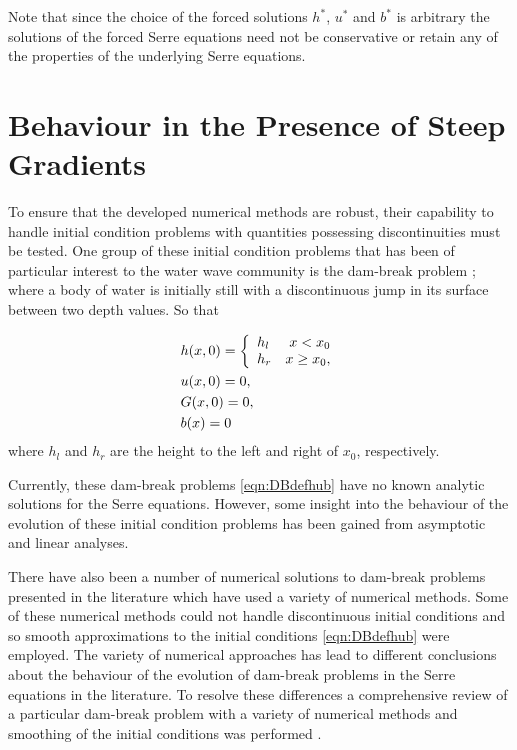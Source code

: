 Note that since the choice of the forced solutions $h^*$, $u^*$ and $b^*$ is arbitrary the solutions of the forced Serre equations need not be conservative or retain any of the properties of the underlying Serre equations. 


\section{Behaviour in the Presence of Steep Gradients}
To ensure that the developed numerical methods are robust, their capability to handle initial condition problems with quantities possessing discontinuities must be tested. One group of these initial condition problems that has been of particular interest to the water wave community is the dam-break problem \cite{El-etal-2006,Hank-etal-2010-2034,Mitsotakis-etal-2014,Mitsotakis-etal-2017,doCarmo-etal-2018-404}; where a body of water is initially still with a discontinuous jump in its surface between two depth values. So that

\begin{subequations}
	\begin{align}
	&h(x,0) =\left\lbrace \begin{array}{l r}
	h_l & x < x_0 \\
	h_r & x \ge x_0,
	\end{array} \right. \\
	&u(x,0) = 0 , \\
	&G(x,0) = 0 , \\
	&b(x) = 0
	\end{align}
	\label{eqn:DBdefhub}
\end{subequations} 
where $h_l$ and $h_r$ are the height to the left and right of $x_0$, respectively. 

Currently, these dam-break problems \eqref{eqn:DBdefhub} have no known analytic solutions for the Serre equations. However, some insight into the behaviour of the evolution of these initial condition problems has been gained from asymptotic \cite{El-etal-2006} and linear \cite{Dougalis-etal-2007} analyses. 

There have also been a number of numerical solutions to dam-break problems presented in the literature \cite{El-etal-2006,Hank-etal-2010-2034,Mitsotakis-etal-2014,Mitsotakis-etal-2017,doCarmo-etal-2018-404} which have used a variety of numerical methods. Some of these numerical methods could not handle discontinuous initial conditions \cite{El-etal-2006,Mitsotakis-etal-2014,Mitsotakis-etal-2017,doCarmo-etal-2018-404} and so smooth approximations to the initial conditions \eqref{eqn:DBdefhub} were employed. The variety of numerical approaches has lead to different conclusions about the behaviour of the evolution of dam-break problems in the Serre equations in the literature. To resolve these differences a comprehensive review of a particular dam-break problem with a variety of numerical methods and smoothing of the initial conditions was performed \cite{Pitt-2018-61}. 

